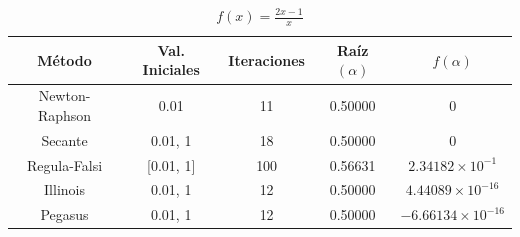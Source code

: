 \begin{table}[H]
\centering

\renewcommand{\arraystretch}{1.3} %
\setlength{\tabcolsep}{12pt}      %

\begin{tabular}{ccccc}
\hline
Método & Val. Iniciales & Iteraciones & Raíz $(\alpha)$ & $f(\alpha)$ \\
\hline

Newton-Raphson & 0.01      &  11 & 0.50000 & 0                    \\

Secante        & 0.01, 1   &  18 & 0.50000 & 0                    \\

Regula-Falsi   & [0.01, 1] & 100 & 0.56631 & $2.34182\times10^{-1}$ \\

Illinois       & 0.01, 1   &  12 & 0.50000 & $4.44089\times10^{-16}$ \\

Pegasus        & 0.01, 1   &  12 & 0.50000 & $-6.66134\times10^{-16}$ \\

\hline
\end{tabular}

\caption{$f(x) = \frac{2 x - 1}{x}$}
\end{table}


